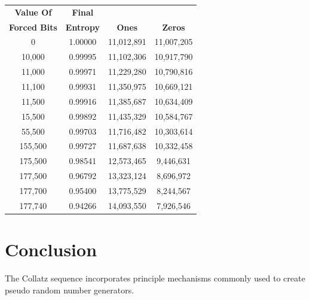 \documentclass[letterpaper]{article}
\begin{document}
\begin{center}
\begin{tabular}{|c|c|c|c|}
\hline
\textbf{Value Of} & \textbf{Final} &&\\
\textbf{Forced Bits} & \textbf{Entropy} & \textbf{Ones} & \textbf{Zeros} \\
\hline
0 & 1.00000 & 11,012,891 & 11,007,205 \\
10,000 & 0.99995 & 11,102,306 & 10,917,790 \\
11,000 & 0.99971 & 11,229,280 & 10,790,816 \\
11,100 & 0.99931 & 11,350,975 & 10,669,121 \\
11,500 & 0.99916 & 11,385,687 & 10,634,409 \\
15,500 & 0.99892 & 11,435,329 & 10,584,767 \\
55,500 & 0.99703 & 11,716,482 & 10,303,614 \\
155,500 & 0.99727 & 11,687,638 & 10,332,458 \\
175,500 & 0.98541 & 12,573,465 & 9,446,631 \\
177,500 & 0.96792 & 13,323,124 & 8,696,972 \\
177,700 & 0.95400 & 13,775,529 & 8,244,567 \\
177,740 & 0.94266 & 14,093,550 & 7,926,546 \\
\hline
\end{tabular}
\end{center}

\section{Conclusion}

The Collatz sequence incorporates principle mechanisms commonly used to create pseudo random number generators.
\end{document}
